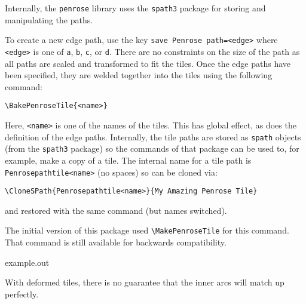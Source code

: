 \documentclass{ltxdoc}
\newenvironment{example}
  {\VerbatimEnvironment
   \begin{VerbatimOut}{example.out}}
  {\end{VerbatimOut}
   \begin{center}
   \setlength{\parindent}{0pt}
   \fbox{\begin{minipage}{.9\linewidth}
     \lstset{breakatwhitespace=true,breaklines=true,language=TeX,basicstyle=\small}
     
   \end{minipage}}

   \fbox{\begin{minipage}{.9\linewidth}
     \centering
     
   \end{minipage}}
\end{center}
}
\begin{document}
Internally, the \Verb+penrose+ library uses the \Verb+spath3+ package for storing and manipulating the paths.

To create a new edge path, use the key \Verb+save Penrose path=<edge>+ where \Verb+<edge>+ is one of \Verb+a+, \Verb+b+, \Verb+c+, or \Verb+d+.
There are no constraints on the size of the path as all paths are scaled and transformed to fit the tiles.
Once the edge paths have been specified, they are welded together into the tiles using the following command:
%
\begin{verbatim}
\BakePenroseTile{<name>}
\end{verbatim}
%
Here, \Verb+<name>+ is one of the names of the tiles.
This has global effect, as does the definition of the edge paths.
Internally, the tile paths are stored as \Verb+spath+ objects (from the \Verb+spath3+ package) so the commands of that package can be used to, for example, make a copy of a tile.
The internal name for a tile path is \Verb+Penrosepathtile<name>+ (no spaces) so can be cloned via:
%
\begin{verbatim}
\CloneSPath{Penrosepathtile<name>}{My Amazing Penrose Tile}
\end{verbatim}
%
and restored with the same command (but names switched).

The initial version of this package used \Verb!\MakePenroseTile! for this command.
That command is still available for backwards compatibility.

\begin{example}
\end{example}

With deformed tiles, there is no guarantee that the inner arcs will match up perfectly.
\end{document}
